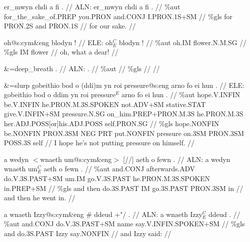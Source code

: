 \documentclass[a4paper,10pt]{article}
\begin{document}
\ex
\begingl[lingstyle=gergl]
\glchat er\_mwyn chdi a fi . //
\glsurface ALN:  er\_mwyn chdi a fi .  //
\glauto \%aut  for\_the\_sake\_of{\scriptsize .PREP} you{\scriptsize .PRON} and{\scriptsize .CONJ} I{\scriptsize .PRON.1S+SM}   //
\glmanual \%gls  for PRON{\scriptsize .2S} and PRON{\scriptsize .1S}   //
\gleng for our sake. //
\endgl
\xe

\ex
\begingl[lingstyle=gergl]
\glchat oh@s:cym\&eng blodyn ! //
\glsurface ELE:  oh$^{C}_{E}$ blodyn !  //
\glauto \%aut  oh{\scriptsize .IM} flower{\scriptsize .N.M.SG}   //
\glmanual \%gls  IM flower   //
\gleng oh, what a dear! //
\endgl
\xe

\ex
\begingl[lingstyle=gergl]
\glchat \&=deep\_breath . //
\glsurface ALN:  .  //
\glauto \%aut    //
\glmanual \%gls    //
\gleng  //
\endgl
\xe

\ex
\begingl[lingstyle=gergl]
\glchat \&=slurp gobeithio bod o (ddi)m yn roi pressure@s:eng arno fo ei hun . //
\glsurface ELE:  gobeithio bod o ddim yn roi pressure$^{E}$ arno fo ei hun .  //
\glauto \%aut  hope{\scriptsize .V.INFIN} be{\scriptsize .V.INFIN} he{\scriptsize .PRON.M.3S.SPOKEN} not{\scriptsize .ADV+SM} stative{\scriptsize .STAT} give{\scriptsize .V.INFIN+SM} pressure{\scriptsize .N.SG} on\_him{\scriptsize .PREP+PRON.M.3S} he{\scriptsize .PRON.M.3S} her{\scriptsize .ADJ.POSS[or]his.ADJ.POSS} self{\scriptsize .PRON.SG}   //
\glmanual \%gls  hope{\scriptsize .NONFIN} be{\scriptsize .NONFIN} PRON{\scriptsize .3SM} NEG PRT put{\scriptsize .NONFIN} pressure on{\scriptsize .3SM} PRON{\scriptsize .3SM} POSS{\scriptsize .3S} self   //
\gleng I hope he's not putting pressure on himself. //
\endgl
\xe

\ex
\begingl[lingstyle=gergl]
\glchat a wedyn $<$wnaeth um@s:cym\&eng$>$ [//] aeth o fewn . //
\glsurface ALN:  a wedyn wnaeth um$^{C}_{E}$ aeth o fewn .  //
\glauto \%aut  and{\scriptsize .CONJ} afterwards{\scriptsize .ADV} do{\scriptsize .V.3S.PAST+SM} um{\scriptsize .IM} go{\scriptsize .V.3S.PAST} he{\scriptsize .PRON.M.3S.SPOKEN} in{\scriptsize .PREP+SM}   //
\glmanual \%gls  and then do{\scriptsize .3S.PAST} IM go{\scriptsize .3S.PAST} PRON{\scriptsize .3SM} in   //
\gleng and then he went in. //
\endgl
\xe

\ex
\begingl[lingstyle=gergl]
\glchat a wnaeth Izzy@s:cym\&eng \# ddeud +"/ . //
\glsurface ALN:  a wnaeth Izzy$^{C}_{E}$ ddeud .  //
\glauto \%aut  and{\scriptsize .CONJ} do{\scriptsize .V.3S.PAST+SM} name say{\scriptsize .V.INFIN.SPOKEN+SM}   //
\glmanual \%gls  and do{\scriptsize .3S.PAST} Izzy say{\scriptsize .NONFIN}   //
\gleng and Izzy said: //
\endgl
\xe
\end{document}
